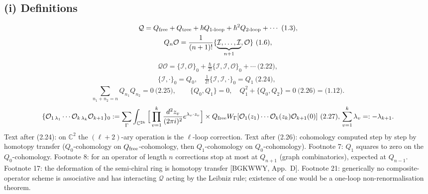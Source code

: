 \documentclass[10pt]{article}
\begin{document}
\subsection{(i) Definitions}
\begin{gather*}
\mathcal Q=Q_{\rm free}+Q_{\rm tree}+\hbar Q_{\text{1-loop}}+\hbar^2Q_{\text{2-loop}}+\cdots\ \text{(1.3)},\\
Q_n\mathcal O=\frac1{(n+1)!}\{\underbrace{\mathcal I,\dots,\mathcal I}_{n+1},\mathcal O\}\ \text{(1.6)},
\end{gather*}
\begin{gather*}
\mathcal Q\mathcal O=\{\mathcal I,\mathcal O\}_0+\frac\hbar{2!}\{\mathcal I,\mathcal I,\mathcal O\}_0+\cdots\ \text{(2.22)},\\
\{\mathcal I,\cdot\}_0=Q_0,\quad\frac1{2!}\{\mathcal I,\mathcal I,\cdot\}_0=Q_1\ \text{(2.24)},
\end{gather*}
\begin{equation*}
\sum_{n_1+n_2=n}Q_{n_1}Q_{n_2}=0\ \text{(2.25)},\qquad \{Q_0,Q_1\}=0,\quad Q_1^2+\{Q_0,Q_2\}=0\ \text{(2.26)}=\text{(1.12)}.
\end{equation*}
\begin{equation*}
\{\mathcal O_{1\,\lambda_1}\cdots\mathcal O_{k\,\lambda_k}\mathcal O_{k+1}\}_0:=\sum_\Gamma\int_{\mathbb C^{2k}}\Big[\prod_{v=1}^k\frac{d^2z_v}{(2\pi i)^2}e^{\lambda_v\cdot z_v}\Big]\\\times Q_{\rm free}W_\Gamma[\mathcal O_1(z_1)\cdots\mathcal O_k(z_k)\mathcal O_{k+1}(0)]\ \text{(2.27)},\\ \sum_{v=1}^k\lambda_v=:-\lambda_{k+1}.
\end{equation*}
Text after (2.24): on $\mathbb C^2$ the $(\ell+2)$-ary operation is the $\ell$-loop correction. Text after (2.26): cohomology computed step by step by homotopy transfer ($Q_0$-cohomology on $Q_{\rm free}$-cohomology, then $Q_1$-cohomology on $Q_0$-cohomology). Footnote 7: $Q_1$ squares to zero on the $Q_0$-cohomology. Footnote 8: for an operator of length $n$ corrections stop at most at $Q_{n+1}$ (graph combinatorics), expected at $Q_{n-1}$. Footnote 17: the deformation of the semi-chiral ring is homotopy transfer [BGKWWY, App.~D]. Footnote 21: generically no composite-operator scheme is associative and has interacting $\mathcal Q$ acting by the Leibniz rule; existence of one would be a one-loop non-renormalisation theorem.
\end{document}
